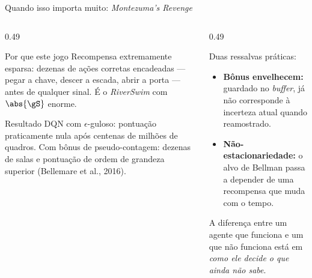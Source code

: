 \documentclass[aspectratio=169, 11pt]{beamer}
\begin{document}
\begin{frame}{Quando isso importa muito: \textit{Montezuma's Revenge}}
  \begin{columns}[T]
    \begin{column}{0.49\textwidth}
      \begin{defbox}{Por que este jogo}
        Recompensa extremamente esparsa: dezenas de ações corretas encadeadas --- pegar
        a chave, descer a escada, abrir a porta --- antes de qualquer sinal. É o
        \textit{RiverSwim} com $\abs{\gS}$ enorme.
      \end{defbox}
      \begin{teobox}{Resultado}
        DQN com $\epsilon$-guloso: pontuação praticamente nula após centenas de milhões
        de quadros. Com bônus de pseudo-contagem: dezenas de salas e pontuação de ordem
        de grandeza superior (Bellemare et al., 2016).
      \end{teobox}
    \end{column}
    \begin{column}{0.49\textwidth}
      \begin{alertabox}
        Duas ressalvas práticas:
        \begin{itemize}
          \item \textbf{Bônus envelhecem:} guardado no \textit{buffer}, já não
                corresponde à incerteza atual quando reamostrado.
          \item \textbf{Não-estacionariedade:} o alvo de Bellman passa a depender de uma
                recompensa que muda com o tempo.
        \end{itemize}
      \end{alertabox}
      \begin{ideiabox}
        A diferença entre um agente que funciona e um que não funciona está em
        \emph{como ele decide o que ainda não sabe}.
      \end{ideiabox}
    \end{column}
  \end{columns}
\end{frame}
\end{document}
